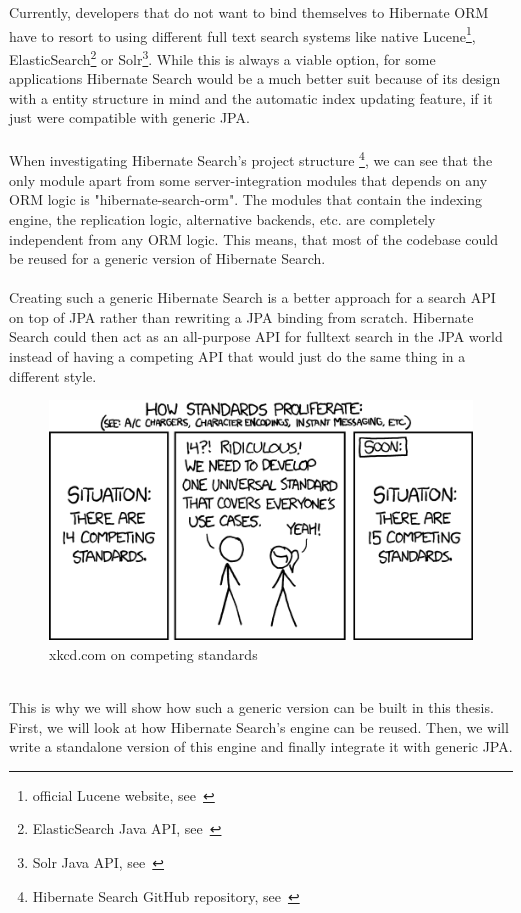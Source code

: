 \noindent
Currently, developers that do not want to bind themselves to Hibernate ORM have to resort to using different full text search systems like native Lucene\footnote{official Lucene website, see~\cite{lucene_apache_org}}, ElasticSearch\footnote{ElasticSearch Java API, see~\cite{elasticsearch_java_api}} or Solr\footnote{Solr Java API, see~\cite{solr_java_api}}. While this is always a viable option, for some applications Hibernate Search would be a much better suit because of its design with a entity structure in mind and the automatic index updating feature, if it just were compatible with generic JPA.
\\\\
When investigating Hibernate Search's project structure
\footnote{Hibernate Search GitHub repository, see~\cite{hsearch_source_code_git}}, we can see that the only module apart from some server-integration modules that depends on any ORM logic is "hibernate-search-orm". The modules that contain the indexing engine, the replication logic, alternative backends, etc. are completely independent from any ORM logic. This means, that most of the codebase could be reused for a generic version of Hibernate Search.
\\\\
\noindent
Creating such a generic Hibernate Search is a better approach for a search API on top of JPA rather than rewriting a JPA binding from scratch. Hibernate Search could then act as an all-purpose API for fulltext search in the JPA world instead of having a competing API that would just do the same thing in a different style.
\\
\begin{figure}[ht]
	\centering
	\includegraphics[scale=0.5]{images/competing_standards.png}
	\caption{xkcd.com on competing standards \protect\footnotemark}
	\label{xkcd_standards_fig}
\end{figure}
\\
This is why we will show how such a generic version can be built in this thesis. First, we will look at how Hibernate Search's engine can be reused. Then, we will write a standalone version of this engine and finally integrate it with generic JPA.

